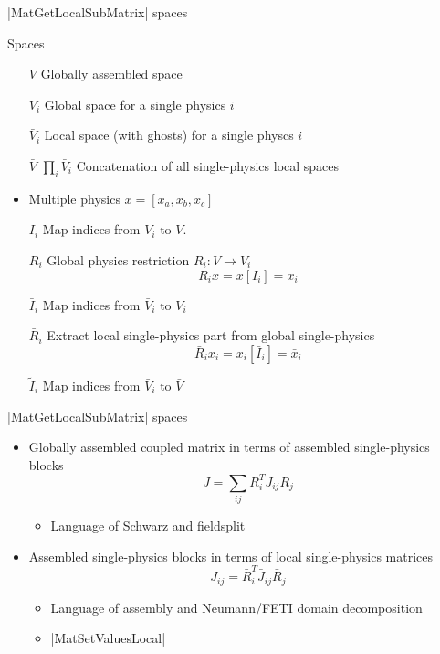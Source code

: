 \begin{frame}[fragile]{\cfunc|MatGetLocalSubMatrix| spaces}
  \begin{block}{Spaces}
    \begin{itemize}
    \item[$V$] Globally assembled space
    \item[$V_i$] Global space for a single physics $i$
    \item[$\bar V_i$] Local space (with ghosts) for a single physcs $i$
    \item[$\bar V$] $\prod_i \bar V_i$ Concatenation of all
      single-physics local spaces
    \end{itemize}
  \end{block}
  \begin{itemize}
  \item Multiple physics $x = [x_a,x_b,x_c]$
  \item[$I_i$] Map indices from $V_i$ to $V$.
  \item[$R_i$] Global physics restriction $R_i : V \to V_i$
    \[ R_i x = x[I_i] = x_i \]
  \item[$\bar I_i$] Map indices from $\bar V_i$ to $V_i$
  \item[$\bar R_i$] Extract local single-physics part from global single-physics
    \[ \bar R_i x_i = x_i[\bar I_i] = \bar x_i \]
  \item[$\tilde I_i$] Map indices from $\bar V_i$ to $\bar V$
  \end{itemize}
\end{frame}

\begin{frame}[fragile]{\cfunc|MatGetLocalSubMatrix| spaces}
\begin{itemize}
    \item Globally assembled coupled matrix in terms of assembled single-physics blocks
    \[ J = \sum_{ij} R_i^T J_{ij} R_j \]
    \begin{itemize}
    \item Language of Schwarz and fieldsplit
    \end{itemize}
  \item Assembled single-physics blocks in terms of local single-physics matrices
    \[ J_{ij} = \bar R_i^T \bar J_{ij} \bar R_j \]
    \begin{itemize}
    \item Language of assembly and Neumann/FETI domain decomposition
    \item \cfunc|MatSetValuesLocal|
    \end{itemize}
  \end{itemize}
\end{frame}
